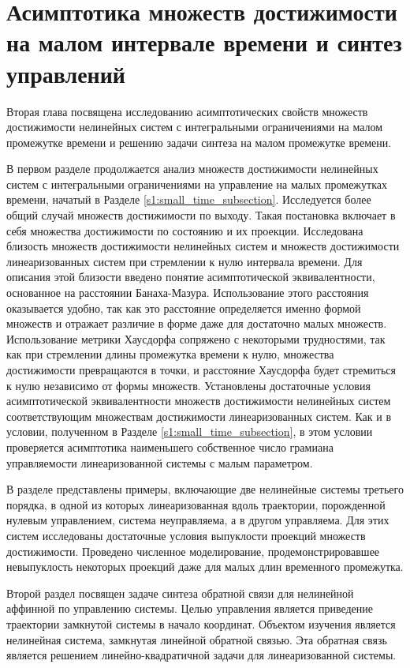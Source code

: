 \documentclass[../main.tex]{subfiles}
\begin{document}
\clearpage
\section{Асимптотика множеств достижимости на малом интервале времени и синтез управлений}

Вторая глава посвящена исследованию асимптотических свойств множеств достижимости нелинейных систем с интегральными ограничениями на малом промежутке времени и решению задачи синтеза на малом промежутке времени. 

В первом разделе продолжается анализ множеств достижимости нелинейных систем с интегральными ограничениями на управление на малых промежутках времени, начатый в Разделе \ref{s1:small_time_subsection}. 
Исследуется более общий случай множеств достижимости по выходу.
Такая постановка включает в себя множества достижимости по состоянию и их проекции.
Исследована близость множеств достижимости нелинейных систем и множеств достижимости линеаризованных систем при стремлении к нулю интервала времени. 
Для описания этой близости введено понятие асимптотической эквивалентности, основанное на расстоянии Банаха-Мазура. 
Использование этого расстояния оказывается удобно, так как это расстояние определяется именно формой множеств и отражает различие в форме даже для достаточно малых множеств. 
Использование метрики Хаусдорфа сопряжено с некоторыми трудностями, так как при стремлении длины промежутка времени к нулю, множества достижимости  превращаются в точки, и расстояние Хаусдорфа будет стремиться к нулю независимо от формы множеств.
Установлены достаточные условия асимптотической эквивалентности множеств достижимости нелинейных систем соответствующим множествам достижимости линеаризованных систем.
Как и в условии, полученном в Разделе \ref{s1:small_time_subsection}, в этом условии проверяется асимптотика наименьшего собственное число грамиана управляемости линеаризованной системы с малым параметром.

В разделе представлены примеры, включающие две нелинейные системы третьего порядка, в одной из которых линеаризованная вдоль траектории, порожденной нулевым управлением, система неуправляема, а в другом управляема.
Для этих систем исследованы достаточные условия выпуклости проекций множеств достижимости. 
Проведено численное моделирование, продемонстрировавшее невыпуклость некоторых проекций даже для малых длин временного промежутка.

Второй раздел посвящен задаче синтеза обратной связи для нелинейной аффинной по управлению системы. 
Целью управления является приведение траектории замкнутой системы в начало координат. 
Объектом изучения является нелинейная система, замкнутая линейной обратной связью. 
Эта обратная связь является решением линейно-квадратичной задачи для линеаризованной системы. 
\end{document}
